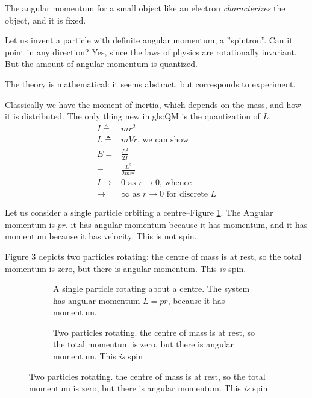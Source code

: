 \documentclass[]{article}
\begin{document}
The angular momentum for a small object like an electron \emph{characterizes} the object, and it is fixed.

Let us invent a particle with definite angular momentum, a ''spintron''. Can it point in any direction? Yes, since the laws of physics are rotationally invariant. But the amount of angular momentum is quantized.

The theory is mathematical: it seems abstract, but corresponds to experiment.

Classically we have the  moment of inertia, which depends on the  mass, and how it is distributed. The only thing new in \glsdesc{gls:QM} is the quantization of $L$.
\begin{align*}
	I\triangleq&mr^2 \\
	L\triangleq&mVr\text{, we can show}\\
	E=&\frac{L^2}{2I}\\
	=&\frac{L^2}{2mr^2}\\
	I\rightarrow&0 \text{ as $r \rightarrow 0 $, whence } \\
	\rightarrow &\infty \text{ as } r \rightarrow 0 \text{ for discrete $L$}
\end{align*}

Let us consider a single particle orbiting a centre--Figure \ref{fig:one:particle:rotating}. The Angular momentum is $pr$. it has angular momentum because it has momentum, and it has momentum because it has velocity. This is not spin.

Figure \ref{fig:two:particles:rotating} depicts two particles rotating: the centre of mass is at rest, so the total momentum is zero, but there is angular momentum. This \emph{is} spin.

\begin{figure}[H]
	\caption{Angular momentum for rotating particles}
	\begin{subfigure}[t]{0.45\textwidth}
		\caption{A single particle rotating about a centre. The system has angular momentum $L=pr$, because it has momentum.}\label{fig:one:particle:rotating}
	\end{subfigure}
	\hfill
	\begin{subfigure}[t]{0.45\textwidth}
		\caption{Two particles rotating. the centre of mass is at rest, so the total momentum is zero, but there is angular momentum. This \emph{is} spin}\label{fig:two:particles:rotating}
	\end{subfigure}
\end{figure}
\end{document}
